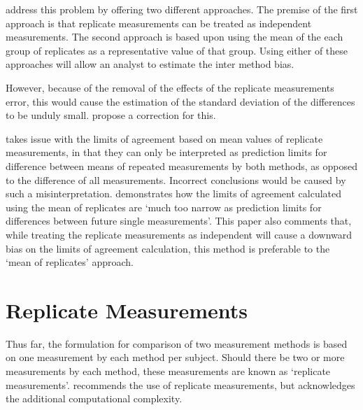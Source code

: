 \documentclass[12pt, a4paper]{report}
\theoremstyle{plain}
\theoremstyle{definition}
\theoremstyle{remark}
\begin{document}
	\citet*{BA86} address this problem by offering two different
	approaches. The premise of the first approach is that replicate
	measurements can be treated as independent measurements. The
	second approach is based upon using the mean of the each group of
	replicates as a representative value of that group. Using either
	of these approaches will allow an analyst to estimate the inter
	method bias.
	
	
	However, because of the removal of the effects of the replicate
	measurements error, this would cause the estimation of the
	standard deviation of the differences to be unduly small.
	\citet*{BA86} propose a correction for this.
	
	\citet{BXC2008} takes issue with the limits of agreement based on
	mean values of replicate measurements, in that they can only be interpreted as prediction
	limits for difference between means of repeated measurements by
	both methods, as opposed to the difference of all measurements.
	Incorrect conclusions would be caused by such a misinterpretation.
	\citet{BXC2008} demonstrates how the limits of agreement
	calculated using the mean of replicates are `much too narrow as
	prediction limits for differences between future single
	measurements'. This paper also comments that, while treating the
	replicate measurements as independent will cause a downward bias
	on the limits of agreement calculation, this method is preferable
	to the `mean of replicates' approach.
	
	
	
	\newpage
	
	\section{Replicate Measurements}
	
	Thus far, the formulation for comparison of two measurement
	methods is based on one measurement by each method per subject. Should there be two or more measurements by each
	method, these measurements are known as `replicate measurements'.
	\citet{BXC2008} recommends the use of replicate measurements, but
	acknowledges the additional computational complexity.
	
\end{document}
